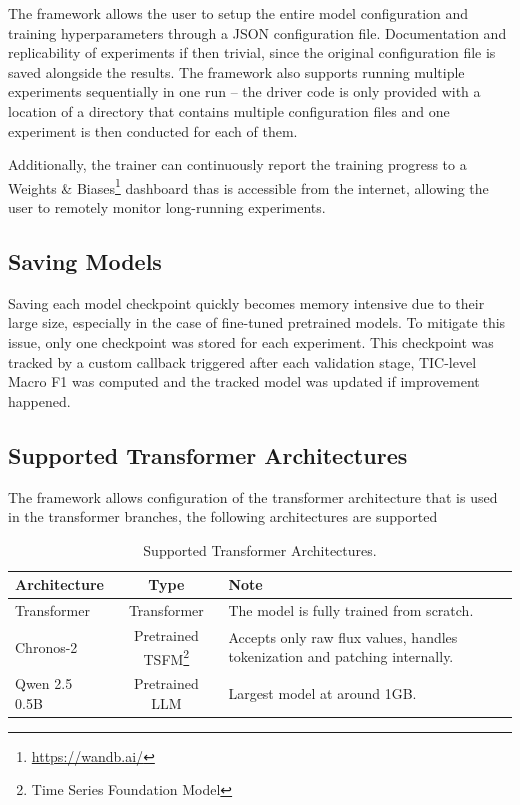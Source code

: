 \bigskip

The framework allows the user to setup the entire model configuration and training hyperparameters through a JSON configuration file.
Documentation and replicability of experiments if then trivial, since the original configuration file is saved alongside the results.
The framework also supports running multiple experiments sequentially in one run -- the driver code is only provided with a location of a directory that contains multiple configuration files and one experiment is then conducted for each of them.

Additionally, the trainer can continuously report the training progress to a Weights \& Biases\footnote{\url{https://wandb.ai/}} dashboard thas is accessible from the internet, allowing the user to remotely monitor long-running experiments.

\subsection{Saving Models}

Saving each model checkpoint quickly becomes memory intensive due to their large size, especially in the case of fine-tuned pretrained models.
To mitigate this issue, only one checkpoint was stored for each experiment.
This checkpoint was tracked by a custom callback triggered after each validation stage, TIC-level Macro F1 was computed and the tracked model was updated if improvement happened.

\subsection{Supported Transformer Architectures}

The framework allows configuration of the transformer architecture that is used in the transformer branches, the following architectures are supported

\begin{table}[H]
    \centering
    \footnotesize
    \renewcommand{\arraystretch}{1.3}
    \begin{tabularx}{\textwidth}{l c X}
        \toprule
        \textbf{Architecture} & \textbf{Type} & \textbf{Note} \tabularnewline
        \midrule
        Transformer & Transformer & The model is fully trained from scratch. \tabularnewline
        Chronos-2 & Pretrained TSFM\footnote{Time Series Foundation Model} & Accepts only raw flux values, handles tokenization and patching internally.  \tabularnewline
        Qwen 2.5 0.5B & Pretrained LLM & Largest model at around 1GB.   \tabularnewline
        \bottomrule
    \end{tabularx}
    \caption[Supported Transformer Architectures]{Supported Transformer Architectures.}
    \label{tab:06_supported_transformer_architecture}
\end{table}

